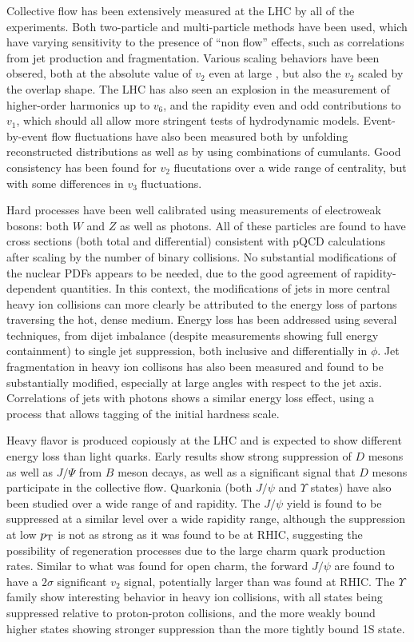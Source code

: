Collective flow has been extensively measured at the LHC by all of the experiments.
Both two-particle and multi-particle methods have been used, which have varying sensitivity to
the presence of ``non flow'' effects, such as correlations from jet production and fragmentation.
Various scaling behaviors have been obsered, both at the absolute value of $v_2$ even at 
large \pT, but also the $v_2$ scaled by the overlap shape.
The LHC has also seen an explosion in the measurement of higher-order harmonics up to $v_6$,
and the rapidity even and odd contributions to $v_1$, which should all
allow more stringent tests of hydrodynamic models.  
Event-by-event flow fluctuations have also been measured both by unfolding reconstructed 
distributions as well as by using combinations of cumulants.  Good consistency has been found
for $v_2$ flucutations over a wide range of centrality, but with some differences in $v_3$
fluctuations.

Hard processes have been well calibrated using measurements of electroweak bosons: both
$W$ and $Z$ as well as photons.  All of these particles are found to have cross sections
(both total and differential)
consistent with pQCD calculations after scaling by the number of binary collisions.
No substantial modifications of the nuclear PDFs appears to be needed, due to the good
agreement of rapidity-dependent quantities.
In this context, the modifications of jets in more central heavy ion collisions can more
clearly be attributed to the energy loss of partons traversing the hot, dense medium.
Energy loss has been addressed using several techniques, from dijet imbalance (despite measurements
showing full energy containment) to
single jet suppression, both inclusive and differentially in $\phi$.  Jet fragmentation
in heavy ion collisons has also been measured and found to be substantially modified, especially at 
large angles with respect to the jet axis.
Correlations of jets with photons shows a similar energy loss effect, using a process that allows
tagging of the initial hardness scale.

Heavy flavor is produced copiously at the LHC and is expected to show different energy loss than
light quarks.  Early results show strong suppression of $D$ mesons as well as $J/\Psi$ from
$B$ meson decays, as well as a significant signal that $D$ mesons participate in the collective flow.
Quarkonia (both $J/\psi$ and $\Upsilon$ states) have also been studied over a wide range of \pT
and rapidity.  The $J/\psi$ yield is found to be suppressed at a similar level over a wide
rapidity range, although the suppression at low $\mbox{$p_{\mathrm{T}}$}$ is not as strong as it was found to be at
RHIC, suggesting the possibility of regeneration processes due to the large charm quark production
rates.  Similar to what was found for open charm, the forward $J/\psi$ are found to have a 
$2\sigma$ significant $v_2$ signal, potentially larger than was found at RHIC.
The $\Upsilon$ family show interesting behavior in heavy ion collisions, with all states being
suppressed relative to proton-proton collisions, and the more weakly bound higher states showing
stronger suppression than the more tightly bound 1S state.  

